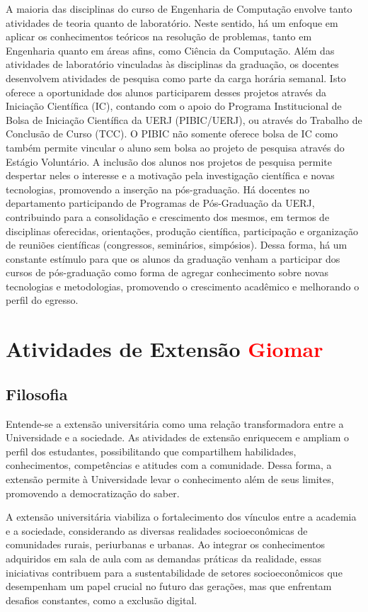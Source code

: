 A maioria das disciplinas do curso de Engenharia de Computação envolve tanto atividades de teoria quanto de laboratório. Neste sentido, há um enfoque em aplicar os conhecimentos teóricos na resolução de problemas, tanto em Engenharia quanto em áreas afins, como Ciência da Computação. Além das atividades de laboratório vinculadas às disciplinas da graduação, os docentes desenvolvem atividades de pesquisa como parte da carga horária semanal. Isto oferece a oportunidade dos alunos participarem desses projetos através da Iniciação Científica (IC), contando com o apoio do Programa Institucional de Bolsa de Iniciação Científica da UERJ (PIBIC/UERJ), ou através do Trabalho de Conclusão de Curso (TCC). O PIBIC não somente oferece bolsa de IC como também permite vincular o aluno sem bolsa ao projeto de pesquisa através do Estágio Voluntário. A inclusão dos alunos nos projetos de pesquisa permite despertar neles o interesse e a motivação pela investigação científica e novas tecnologias, promovendo a inserção na pós-graduação. Há docentes no departamento participando de Programas de Pós-Graduação da UERJ, contribuindo para a consolidação e crescimento dos mesmos, em termos de disciplinas oferecidas, orientações, produção científica, participação e organização de reuniões científicas (congressos, seminários, simpósios). Dessa forma, há um constante estímulo para que os alunos da graduação venham a participar dos cursos de pós-graduação como forma de agregar conhecimento sobre novas tecnologias e metodologias, promovendo o crescimento acadêmico e melhorando o perfil do egresso.

\section{Atividades de Extensão \textcolor{red}{Giomar}}

\subsection{Filosofia}
Entende-se a extensão universitária como uma relação transformadora entre a Universidade e a sociedade. As atividades de extensão enriquecem e ampliam o perfil dos estudantes, possibilitando que compartilhem habilidades, conhecimentos, competências e atitudes com a comunidade. Dessa forma, a extensão permite à Universidade levar o conhecimento além de seus limites, promovendo a democratização do saber. 

A extensão universitária viabiliza o fortalecimento dos vínculos entre a academia e a sociedade, considerando as diversas realidades socioeconômicas de comunidades rurais, periurbanas e urbanas. Ao integrar os conhecimentos adquiridos em sala de aula com as demandas práticas da realidade, essas iniciativas contribuem para a sustentabilidade de setores socioeconômicos que desempenham um papel crucial no futuro das gerações, mas que enfrentam desafios constantes, como a exclusão digital.


